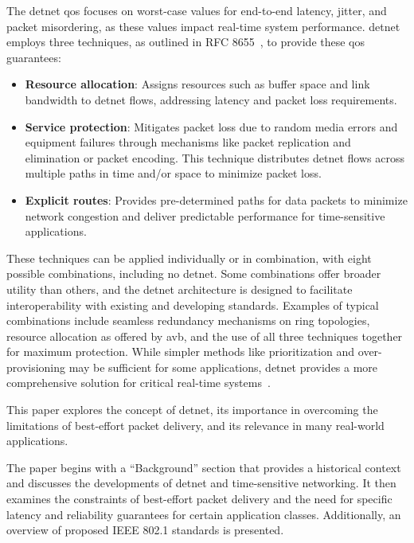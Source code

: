 \documentclass[runningheads]{llncs}
\begin{document}
The \gls{detnet} \gls{qos} focuses on worst-case values for end-to-end latency, jitter, and packet misordering, as these values impact real-time system performance. \gls{detnet} employs three techniques, as outlined in RFC 8655~\cite{rfc8655}, to provide these \gls{qos} guarantees:

\begin{itemize}
  \item \textbf{Resource allocation}: Assigns resources such as buffer space and link bandwidth to \gls{detnet} flows, addressing latency and packet loss requirements.
  \item \textbf{Service protection}: Mitigates packet loss due to random media errors and equipment failures through mechanisms like packet replication and elimination or packet encoding. This technique distributes \gls{detnet} flows across multiple paths in time and/or space to minimize packet loss.
  \item \textbf{Explicit routes}: Provides pre-determined paths for data packets to minimize network congestion and deliver predictable performance for time-sensitive applications.
\end{itemize}

These techniques can be applied individually or in combination, with eight possible combinations, including no \gls{detnet}. Some combinations offer broader utility than others, and the \gls{detnet} architecture is designed to facilitate interoperability with existing and developing standards. Examples of typical combinations include seamless redundancy mechanisms on ring topologies, resource allocation as offered by \gls{avb}, and the use of all three techniques together for maximum protection. While simpler methods like prioritization and over-provisioning may be sufficient for some applications, \gls{detnet} provides a more comprehensive solution for critical real-time systems~\cite{rfc8655}.

This paper explores the concept of \gls{detnet}, its importance in overcoming the limitations of best-effort packet delivery, and its relevance in many real-world applications.

The paper begins with a ``Background'' section that provides a historical context and discusses the developments of \gls{detnet} and time-sensitive networking. It then examines the constraints of best-effort packet delivery and the need for specific latency and reliability guarantees for certain application classes. Additionally, an overview of proposed IEEE 802.1 standards is presented.
\end{document}
